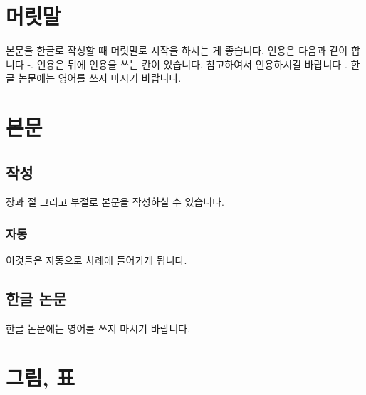 \documentclass[doctor,korean,final]{kmu}
\begin{document}
\tableofcontents

\listoftables

\listoffigures


\chapter{머릿말}
본문을 한글로 작성할 때 머릿말로 시작을 하시는 게 좋습니다. \cite{FD1}
인용은 다음과 같이 합니다 \cite{RVP1}-\cite{ML2}.
인용은 뒤에 인용을 쓰는 칸이 있습니다. 참고하여서 인용하시길 바랍니다 \cite{SOCA2,EF2}.
한글 논문에는 영어를 쓰지 마시기 바랍니다. 

\chapter{본문}












\section{작성}

장과 절 그리고 부절로 본문을 작성하실 수 있습니다.

\subsection{자동}

이것들은 자동으로 차례에 들어가게 됩니다.

\section{한글 논문}

한글 논문에는 영어를 쓰지 마시기 바랍니다.

\chapter{그림, 표}
\end{document}
